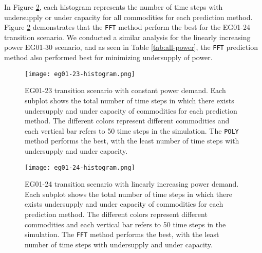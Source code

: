In Figure \ref{fig:eg24under}, each histogram represents 
the number of time steps with undersupply or 
under capacity for all commodities for each prediction method.  
Figure \ref{fig:eg24under} demonstrates that the \texttt{FFT} method 
perform the best for the EG01-24 transition scenario.
We conducted a similar analysis for the linearly increasing power 
EG01-30 scenario, and 
as seen in Table \ref{tab:all-power}, the \texttt{FFT} prediction method 
also performed best for minimizing undersupply of power. 

\begin{figure}[]
	\centering
	\texttt{[image: eg01-23-histogram.png]} 
	\caption{
	EG01-23 transition scenario with constant power demand. 
	Each subplot shows the total number of time steps in which there exists 
	undersupply and under capacity of commodities for each prediction method. 
	The different colors represent different commodities and each vertical bar refers 
	to 50 time steps in the simulation.
	The \texttt{POLY} method performs the best, with the least number of 
	time steps with undersupply and under capacity.}
	\label{fig:eg23under}
\end{figure}

\begin{figure}[]
	\centering
	\texttt{[image: eg01-24-histogram.png]} 
	\caption{
	EG01-24 transition scenario with linearly increasing power demand. 
	Each subplot shows the total number of time steps in which there exists 
	undersupply and under capacity of commodities for each prediction method. 
	The different colors represent different commodities and each vertical bar refers 
	to 50 time steps in the simulation.
	The \texttt{FFT} method performs the best, with the least number of 
	time steps with undersupply and under capacity.}
	\label{fig:eg24under}
\end{figure}

